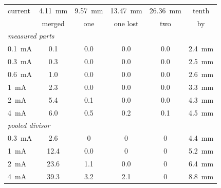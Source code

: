\begin{tabular}{lccccc}
\toprule
current & 4.11~mm & 9.57~mm & 13.47~mm & 26.36~mm & tenth \\
 & merged & one & one lost & two & by \\
\midrule
\multicolumn{6}{l}{\textit{measured parts}} \\
0.1~mA & 0.1 & 0.0 & 0.0 & 0.0 & 2.4~mm \\
0.3~mA & 0.3 & 0.0 & 0.0 & 0.0 & 2.5~mm \\
0.6~mA & 1.0 & 0.0 & 0.0 & 0.0 & 2.6~mm \\
1~mA & 2.3 & 0.0 & 0.0 & 0.0 & 3.3~mm \\
2~mA & 5.4 & 0.1 & 0.0 & 0.0 & 4.3~mm \\
4~mA & 6.0 & 0.5 & 0.2 & 0.1 & 4.5~mm \\
\midrule
\multicolumn{6}{l}{\textit{pooled divisor}} \\
0.3~mA & 2.6 & 0 & 0 & 0 & 4.4~mm \\
1~mA & 12.4 & 0.0 & 0 & 0 & 5.2~mm \\
2~mA & 23.6 & 1.1 & 0.0 & 0 & 6.4~mm \\
4~mA & 39.3 & 3.2 & 2.1 & 0 & 8.8~mm \\
\bottomrule
\end{tabular}
